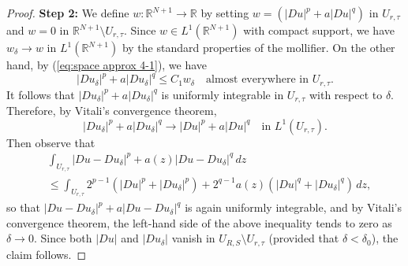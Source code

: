\documentclass[10pt,a4paper]{amsart}
\numberwithin{equation}{section}
\newcommand{\RR}{\mathds{R}}
\begin{document}
\begin{proof}
\textbf{Step 2:} We define $w:\RR^{N+1}\rightarrow\RR$
by setting $w=(\left|Du\right|^{p}+a\left|Du\right|^{q})$ in $U_{r, \tau}$
and $w=0$ in $\RR^{N+1}\setminus U_{r, \tau}.$ Since $w\in L^{1}(\RR^{N+1})$
with compact support, we have $w_{\delta}\rightarrow w$ in $L^{1}(\RR^{N+1})$
by the standard properties of the mollifier. On the other hand, by (\ref{eq:space approx 4-1}),
we have
\[
\left|Du_{\delta}\right|^{p}+a\left|Du_{\delta}\right|^{q}\leq C_{1}w_{\delta}\quad\text{almost everywhere in }U_{r, \tau}.
\]
It follows that $\left|Du_{\delta}\right|^{p}+a\left|Du_{\delta}\right|^{q}$
is uniformly integrable in $U_{r, \tau}$ with respect to $\delta$.
Therefore, by Vitali's convergence theorem, 
\[
\left|Du_{\delta}\right|^{p}+a\left|Du_{\delta}\right|^{q}\rightarrow\left|Du\right|^{p}+a\left|Du\right|^{q}\quad\text{in }L^{1}(U_{r, \tau}).
\]
Then observe that
\begin{align*}
 & \int_{U_{r, \tau}}\left|Du-Du_{\delta}\right|^{p}+a(z)\left|Du-Du_{\delta}\right|^{q}\, d z\\
 & \leq\int_{U_{r, \tau}}2^{p-1}(\left|Du\right|^{p}+\left|Du_{\delta}\right|^{p})+2^{q-1}a(z)(\left|Du\right|^{q}+\left|Du_{\delta}\right|^{q})\, d z,
\end{align*}
so that $\left|Du-Du_{\delta}\right|^{p}+a\left|Du-Du_{\delta}\right|^{q}$
is again uniformly integrable, and by Vitali's convergence theorem,
the left-hand side of the above inequality tends to zero as $\delta\rightarrow0$.
Since both $\left|Du\right|$ and $\left|Du_{\delta}\right|$ vanish
in $U_{R, S}\setminus U_{r, \tau}$ (provided that $\delta<\delta_{0}$),
the claim follows.
\end{proof}
\end{document}
